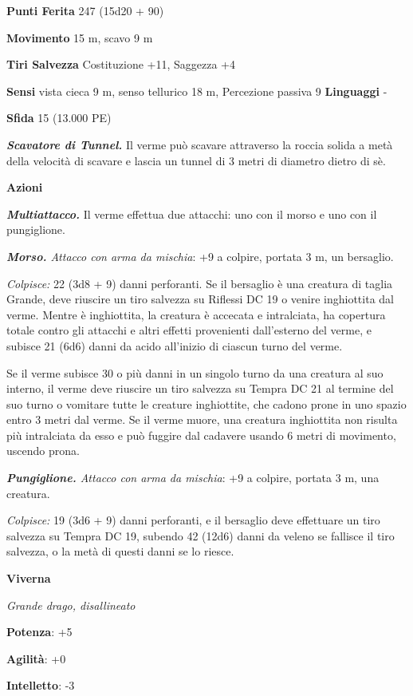 \begin{multicols}{2}
\textbf{Punti Ferita} 247 (15d20 + 90)

\textbf{Movimento} 15 m, scavo 9 m

\textbf{Tiri Salvezza} Costituzione +11, Saggezza +4

\textbf{Sensi} vista cieca 9 m, senso tellurico 18 m, Percezione passiva
9 \textbf{Linguaggi} -

\textbf{Sfida} 15 (13.000 PE)\smallskip

\emph{\textbf{Scavatore di Tunnel.}} Il verme può scavare attraverso la
roccia solida a metà della velocità di scavare e lascia un tunnel di 3
metri di diametro dietro di sè.

\smallskip\textbf{Azioni}

\emph{\textbf{Multiattacco.}} Il verme effettua due attacchi: uno con il
morso e uno con il pungiglione.

\emph{\textbf{Morso.} Attacco con arma da mischia}: +9 a colpire,
portata 3 m, un bersaglio.

\emph{Colpisce:} 22 (3d8 + 9) danni perforanti. Se il bersaglio è una
creatura di taglia Grande, deve riuscire un tiro salvezza su Riflessi
DC 19 o venire inghiottita dal verme. Mentre è inghiottita, la creatura
è accecata e intralciata, ha copertura totale contro gli attacchi e
altri effetti provenienti dall'esterno del verme, e subisce 21 (6d6)
danni da acido all'inizio di ciascun turno del verme.

Se il verme subisce 30 o più danni in un singolo turno da una creatura
al suo interno, il verme deve riuscire un tiro salvezza su Tempra
DC 21 al termine del suo turno o vomitare tutte le creature inghiottite,
che cadono prone in uno spazio entro 3 metri dal verme. Se il verme
muore, una creatura inghiottita non risulta più intralciata da esso e
può fuggire dal cadavere usando 6 metri di movimento, uscendo prona.

\emph{\textbf{Pungiglione.} Attacco con arma da mischia}: +9 a colpire,
portata 3 m, una creatura.

\emph{Colpisce:} 19 (3d6 + 9) danni perforanti, e il bersaglio deve
effettuare un tiro salvezza su Tempra DC 19, subendo 42 (12d6)
danni da veleno se fallisce il tiro salvezza, o la metà di questi danni
se lo riesce.

\textbf{Viverna}

\emph{Grande drago, disallineato}

\textbf{Potenza}: +5

\textbf{Agilità}: +0

\textbf{Intelletto}: -3


\end{multicols}

